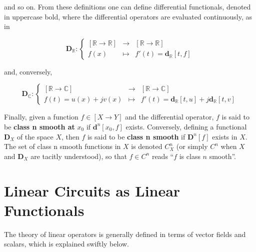 	\noindent and so on. From these definitions one can define differential functionals, denoted in uppercase bold, where the differential operators are evaluated continuously, as in

\begin{equation}\mathbf{D}_\mathbb{R}: \left\{\begin{array}{rcl} \left[\mathbb{R}\to\mathbb{R}\right] &\to& \left[\mathbb{R}\to\mathbb{R}\right] \\[3mm] f(x) &\mapsto& f'(t) = \mathbf{d}_\mathbb{R}\left[t,f\right] \end{array}\right.\end{equation}

	\noindent and, conversely,

\begin{equation}\mathbf{D}_\mathbb{C}: \left\{\begin{array}{ccc} \left[\mathbb{R} \to\mathbb{C}\right] &\to& \left[\mathbb{R}\to\mathbb{C}\right] \\[3mm] f(t) = u(x) + jv(x) &\mapsto& f'(t) = \mathbf{d}_\mathbb{R}\left[t,u\right] + j \mathbf{d}_\mathbb{R}\left[t,v\right]\end{array}\right.\end{equation}

	Finally, given a function $f\in\left[X\to Y\right]$ and the differential operator, $f$ is said to be \textbf{class n smooth at} $x_0$ if $\mathbf{d}^n\left[x_0,f\right]$ exists. Conversely, defining a functional $\mathbf{D}_X$ of the space $X$, then $f$ is said to be \textbf{class n smooth} if $\mathbf{D}^n\left[f\right]$ exists in $X$. The set of class n smooth functions in $X$ is denoted $C_X^n$ (or simply $C^n$ when $X$ and $\mathbf{D}_X$ are tacitly understood), so that $f\in C^n$ reads ``$f$ is class $n$ smooth''.

\section{Linear Circuits as Linear Functionals} %

	The theory of linear operators is generally defined in terms of vector fields and scalars, which is explained swiftly below.

